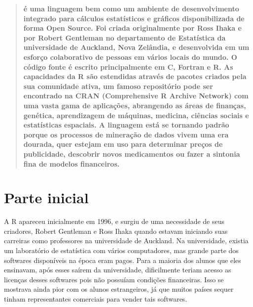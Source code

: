 \documentclass[a4paper,11pt]{article}
\begin{document}
	
\maketitle %
\thispagestyle{fancy} %

\begin{abstract}
  \textbf{ é uma linguagem bem como um ambiente de desenvolvimento integrado para cálculos estatísticos e gráficos disponibilizada de forma Open Source. Foi criada originalmente por Ross Ihaka e por Robert Gentleman no departamento de Estatística da universidade de Auckland, Nova Zelândia, e desenvolvida em um esforço colaborativo de pessoas em vários locais do mundo. O código fonte é escrito principalmente em C, Fortran e R. As capacidades da R são estendidas através de pacotes criados pela sua comunidade ativa, um famoso repositório pode ser encontrado na CRAN\cite{cranoficial} (Comprehensive R Archive Network) com uma vasta gama de aplicações, abrangendo as áreas de finanças, genética, aprendizagem de máquinas, medicina, ciências sociais e estatísticas espaciais. A linguagem está se tornando padrão porque os processos de mineração de dados vivem uma era dourada, quer estejam em uso para determinar preços de publicidade, descobrir novos medicamentos ou fazer a sintonia fina de modelos financeiros.}
\end{abstract}
\vspace{20pt}

\section{Parte inicial}
A R apareceu inicialmente em 1996, e surgiu de uma necessidade de seus criadores, Robert Gentleman e Ross Ihaka quando estavam iniciando suas carreiras como professores na universidade de Auckland. Na universidade, existia um laboratório de estatística com vários computadores, mas grande parte dos softwares disponíveis na época eram pagos. Para a maioria dos alunos que eles ensinavam, após esses saírem da universidade, dificilmente teriam acesso as licenças desses softwares pois não possuíam condições financeiras. Isso se mostrava ainda pior com os alunos estrangeiros, já que muitos países sequer tinham representantes comerciais para vender tais softwares.
\end{document}
